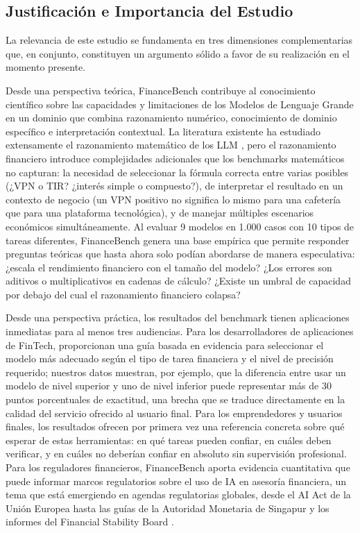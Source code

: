 \documentclass[12pt,a4paper]{article}
\begin{document}
\subsection{Justificación e Importancia del Estudio}

La relevancia de este estudio se fundamenta en tres dimensiones complementarias que, en conjunto, constituyen un argumento sólido a favor de su realización en el momento presente.

Desde una perspectiva teórica, FinanceBench contribuye al conocimiento científico sobre las capacidades y limitaciones de los Modelos de Lenguaje Grande en un dominio que combina razonamiento numérico, conocimiento de dominio específico e interpretación contextual. La literatura existente ha estudiado extensamente el razonamiento matemático de los LLM \citep{Wei2022, Cobbe2021, Hendrycks2021b}, pero el razonamiento financiero introduce complejidades adicionales que los benchmarks matemáticos no capturan: la necesidad de seleccionar la fórmula correcta entre varias posibles (¿VPN o TIR? ¿interés simple o compuesto?), de interpretar el resultado en un contexto de negocio (un VPN positivo no significa lo mismo para una cafetería que para una plataforma tecnológica), y de manejar múltiples escenarios económicos simultáneamente. Al evaluar 9 modelos en 1.000 casos con 10 tipos de tareas diferentes, FinanceBench genera una base empírica que permite responder preguntas teóricas que hasta ahora solo podían abordarse de manera especulativa: ¿escala el rendimiento financiero con el tamaño del modelo? ¿Los errores son aditivos o multiplicativos en cadenas de cálculo? ¿Existe un umbral de capacidad por debajo del cual el razonamiento financiero colapsa?

Desde una perspectiva práctica, los resultados del benchmark tienen aplicaciones inmediatas para al menos tres audiencias. Para los desarrolladores de aplicaciones de FinTech, proporcionan una guía basada en evidencia para seleccionar el modelo más adecuado según el tipo de tarea financiera y el nivel de precisión requerido; nuestros datos muestran, por ejemplo, que la diferencia entre usar un modelo de nivel superior y uno de nivel inferior puede representar más de 30 puntos porcentuales de exactitud, una brecha que se traduce directamente en la calidad del servicio ofrecido al usuario final. Para los emprendedores y usuarios finales, los resultados ofrecen por primera vez una referencia concreta sobre qué esperar de estas herramientas: en qué tareas pueden confiar, en cuáles deben verificar, y en cuáles no deberían confiar en absoluto sin supervisión profesional. Para los reguladores financieros, FinanceBench aporta evidencia cuantitativa que puede informar marcos regulatorios sobre el uso de IA en asesoría financiera, un tema que está emergiendo en agendas regulatorias globales, desde el AI Act de la Unión Europea hasta las guías de la Autoridad Monetaria de Singapur \citep{MAS2025} y los informes del Financial Stability Board \citep{FSB2024}.
\end{document}
